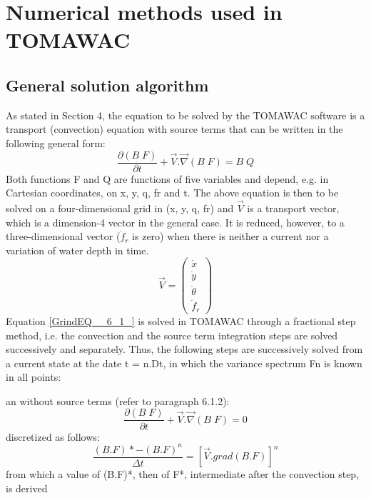 

\chapter{  Numerical methods used in TOMAWAC}


\section{ General solution algorithm}

 As stated in Section 4, the equation to be solved by the TOMAWAC software is a transport (convection) equation with source terms that can be written in the following general form:
\begin{equation} \label{GrindEQ__6_1_}
\frac{\partial \left(B\; F\right)}{\partial t} +\vec{V}.\vec{\nabla }\left(B\; F\right)=B\; Q
\end{equation}
Both functions F and Q are functions of five variables and depend, e.g. in Cartesian coordinates, on x, y, q, fr and t. The above equation is then to be solved on a four-dimensional grid in (x, y, q, fr) and $\vec{V}$ is a transport vector, which is a dimension-4 vector in the general case. It is reduced, however, to a three-dimensional vector ($\dot{f}_{r} $ is zero) when there is neither a current nor a variation of water depth in time.
\begin{equation} \label{GrindEQ__6_2_}
\vec{V}=\left(\begin{array}{c} {\dot{x}} \\ {\dot{y}} \\ {\dot{\theta }} \\ {\dot{f}_{r} } \end{array}\right)
\end{equation}
Equation \eqref{GrindEQ__6_1_} is solved in TOMAWAC through a fractional step method, i.e. the convection and the source term integration steps are solved successively and separately. Thus, the following steps are successively solved from a current state at the date t = n.Dt, in which the variance spectrum Fn is known in all points:

  an \textbf{} without source terms (refer to paragraph 6.1.2):
\begin{equation} \label{GrindEQ__6_3_}
\frac{\partial \left(B\; F\right)}{\partial t} +\vec{V}.\vec{\nabla }\left(B\; F\right)=0
\end{equation}
discretized as follows:
\begin{equation} \label{GrindEQ__6_4_}
\frac{(B.F)*-(B.F)^{n} }{\Delta t} =\left[\vec{V}.grad(B.F)\right]^{n}
\end{equation}
from which a value of (B.F)*, then of F*, intermediate after the convection step, is derived

